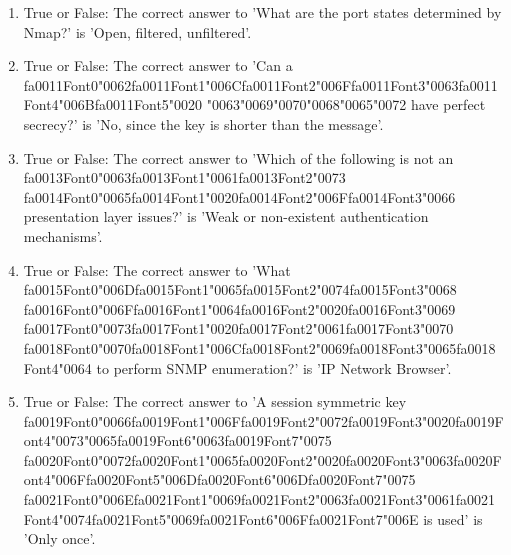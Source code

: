 \documentclass[12pt]{article}
\begin{document}
\begin{enumerate}[label=\arabic*.]
\item True or False: The correct answer to 'What are the port states determined by Nmap?' is 'Open, filtered, unfiltered'.
\item True or False: The correct answer to 'Can a {\csname fa0011Font0\endcsname\char"0062}{\csname fa0011Font1\endcsname\char"006C}{\csname fa0011Font2\endcsname\char"006F}{\csname fa0011Font3\endcsname\char"0063}{\csname fa0011Font4\endcsname\char"006B}{\csname fa0011Font5\endcsname\char"0020} {\char"0063}{\char"0069}{\char"0070}{\char"0068}{\char"0065}{\char"0072} have perfect secrecy?' is 'No, since the key is shorter than the message'.
\item True or False: The correct answer to 'Which of the following is not an {\csname fa0013Font0\endcsname\char"0063}{\csname fa0013Font1\endcsname\char"0061}{\csname fa0013Font2\endcsname\char"0073} {\csname fa0014Font0\endcsname\char"0065}{\csname fa0014Font1\endcsname\char"0020}{\csname fa0014Font2\endcsname\char"006F}{\csname fa0014Font3\endcsname\char"0066} presentation layer issues?' is 'Weak or non-existent authentication mechanisms'.
\item True or False: The correct answer to 'What {\csname fa0015Font0\endcsname\char"006D}{\csname fa0015Font1\endcsname\char"0065}{\csname fa0015Font2\endcsname\char"0074}{\csname fa0015Font3\endcsname\char"0068} {\csname fa0016Font0\endcsname\char"006F}{\csname fa0016Font1\endcsname\char"0064}{\csname fa0016Font2\endcsname\char"0020}{\csname fa0016Font3\endcsname\char"0069} {\csname fa0017Font0\endcsname\char"0073}{\csname fa0017Font1\endcsname\char"0020}{\csname fa0017Font2\endcsname\char"0061}{\csname fa0017Font3\endcsname\char"0070} {\csname fa0018Font0\endcsname\char"0070}{\csname fa0018Font1\endcsname\char"006C}{\csname fa0018Font2\endcsname\char"0069}{\csname fa0018Font3\endcsname\char"0065}{\csname fa0018Font4\endcsname\char"0064} to perform SNMP enumeration?' is 'IP Network Browser'.
\item True or False: The correct answer to 'A session symmetric key {\csname fa0019Font0\endcsname\char"0066}{\csname fa0019Font1\endcsname\char"006F}{\csname fa0019Font2\endcsname\char"0072}{\csname fa0019Font3\endcsname\char"0020}{\csname fa0019Font4\endcsname\char"0073}{\char"0065}{\csname fa0019Font6\endcsname\char"0063}{\csname fa0019Font7\endcsname\char"0075} {\csname fa0020Font0\endcsname\char"0072}{\csname fa0020Font1\endcsname\char"0065}{\csname fa0020Font2\endcsname\char"0020}{\csname fa0020Font3\endcsname\char"0063}{\csname fa0020Font4\endcsname\char"006F}{\csname fa0020Font5\endcsname\char"006D}{\csname fa0020Font6\endcsname\char"006D}{\csname fa0020Font7\endcsname\char"0075} {\csname fa0021Font0\endcsname\char"006E}{\csname fa0021Font1\endcsname\char"0069}{\csname fa0021Font2\endcsname\char"0063}{\csname fa0021Font3\endcsname\char"0061}{\csname fa0021Font4\endcsname\char"0074}{\csname fa0021Font5\endcsname\char"0069}{\csname fa0021Font6\endcsname\char"006F}{\csname fa0021Font7\endcsname\char"006E} is used' is 'Only once'.

\end{enumerate}
\end{document}
